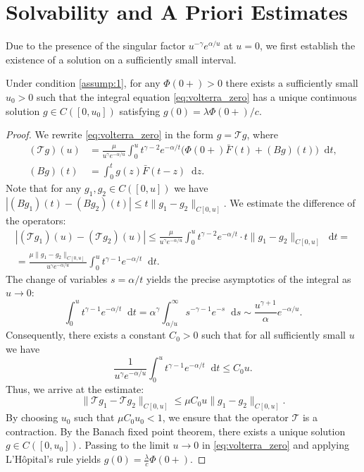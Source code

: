 \documentclass[smallextended]{svjour3}
\providecommand{\diff}{\mathop{}\!\mathrm{d}}
\begin{document}
\section{Solvability and A Priori Estimates}
\label{sec:existence}

Due to the presence of the singular factor $u^{-\gamma} e^{\alpha/u}$ at $u=0$, we first establish the existence of a solution on a sufficiently small interval.

\begin{lemma}\label{lem:local}
Under condition \ref{assump:1}, for any $\Phi(0+) > 0$ there exists a sufficiently small $u_0 > 0$ such that the integral equation \eqref{eq:volterra_zero} has a unique continuous solution $g \in C([0, u_0])$ satisfying $g(0) = \lambda \Phi(0+)/c$.
\end{lemma}
\begin{proof}
We rewrite \eqref{eq:volterra_zero} in the form $g = \mathcal{T}g$, where
\begin{align*}
    (\mathcal{T}g)(u) &= \frac{\mu}{u^\gamma e^{-\alpha/u}} \int_0^u t^{\gamma-2} e^{-\alpha/t} \bigl( \Phi(0+)\bar F(t) + (Bg)(t) \bigr) \diff t,
    \\
    (Bg)(t) &= \int_0^t g(z)\bar F(t-z) \diff z.
\end{align*}
Note that for any $g_1, g_2 \in C([0,u])$ we have $|(Bg_1)(t) - (Bg_2)(t)| \le t \|g_1-g_2\|_{C[0,u]}$. We estimate the difference of the operators:
\begin{multline*}
    |(\mathcal{T}g_1)(u) - (\mathcal{T}g_2)(u)|
    \le \frac{\mu}{u^\gamma e^{-\alpha/u}} \int_0^u t^{\gamma-2} e^{-\alpha/t} \cdot t \|g_1-g_2\|_{C[0,u]} \diff t =
    \\
    = \frac{\mu \|g_1-g_2\|_{C[0,u]}}{u^\gamma e^{-\alpha/u}} \int_0^u t^{\gamma-1} e^{-\alpha/t} \diff t.
\end{multline*}
The change of variables $s = \alpha/t$ yields the precise asymptotics of the integral as $u \to 0$:
\[
\int_0^u t^{\gamma-1} e^{-\alpha/t} \diff t = \alpha^{\gamma} \int_{\alpha/u}^{\infty} s^{-\gamma-1} e^{-s} \diff s \sim \frac{u^{\gamma+1}}{\alpha} e^{-\alpha/u}.
\]
Consequently, there exists a constant $C_0 > 0$ such that for all sufficiently small $u$ we have
\[
\frac{1}{u^\gamma e^{-\alpha/u}} \int_0^u t^{\gamma-1} e^{-\alpha/t} \diff t \le C_0 u.
\]
Thus, we arrive at the estimate:
\[
\|\mathcal{T}g_1 - \mathcal{T}g_2\|_{C[0,u]} \le \mu C_0 u \|g_1-g_2\|_{C[0,u]}.
\]
By choosing $u_0$ such that $\mu C_0 u_0 < 1$, we ensure that the operator $\mathcal{T}$ is a contraction. By the Banach fixed point theorem, there exists a unique solution $g \in C([0,u_0])$. Passing to the limit $u\to 0$ in \eqref{eq:volterra_zero} and applying L'Hôpital's rule yields $g(0) = \frac{\lambda}{c}\Phi(0+)$.
\end{proof}
\end{document}
